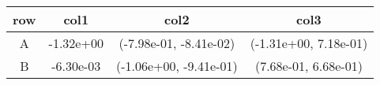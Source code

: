 \begin{tabular}{cccc}
\toprule
row&col1&col2&col3\tabularnewline
\midrule
A&-1.32e+00& (-7.98e-01, -8.41e-02)& (-1.31e+00, 7.18e-01)\tabularnewline
B&-6.30e-03& (-1.06e+00, -9.41e-01)& (7.68e-01, 6.68e-01)\tabularnewline
\bottomrule
\end{tabular}
